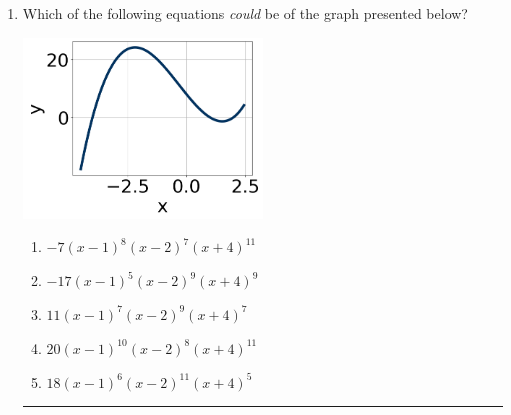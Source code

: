 \documentclass[14pt]{extbook}
\newcommand{\litem}[1]{\item#1\hspace*{-1cm}\rule{\textwidth}{0.4pt}}
\begin{document}
\begin{enumerate}
{\begin{enumerate}[label=\Alph*.]
\end{enumerate} }
\litem{
Which of the following equations \textit{could} be of the graph presented below?
\begin{center}
    \includegraphics[width=0.5\textwidth]{../Figures/polyGraphToFunctionB.png}
\end{center}
\begin{enumerate}[label=\Alph*.]
\item \( -7(x - 1)^{8} (x - 2)^{7} (x + 4)^{11} \)
\item \( -17(x - 1)^{5} (x - 2)^{9} (x + 4)^{9} \)
\item \( 11(x - 1)^{7} (x - 2)^{9} (x + 4)^{7} \)
\item \( 20(x - 1)^{10} (x - 2)^{8} (x + 4)^{11} \)
\item \( 18(x - 1)^{6} (x - 2)^{11} (x + 4)^{5} \)


\end{enumerate}}
\end{enumerate}
\end{document}
